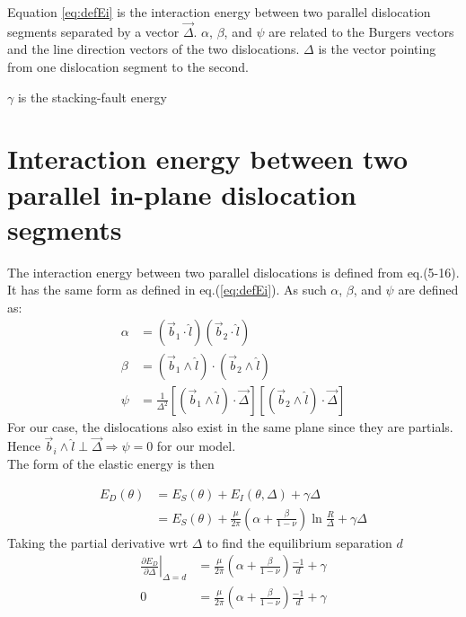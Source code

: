 \documentclass[10pt,a4paper,final]{article}
\begin{document}
Equation \ref{eq:defEi} is the interaction energy between two parallel dislocation segments separated by a vector $\vec{\Delta}$. $\alpha$, $\beta$, and $\psi$ are related to the Burgers vectors and the line direction vectors of the two dislocations. $\Delta$ is the vector pointing from one dislocation segment to the second.

$\gamma$ is the stacking-fault energy

\section{Interaction energy between two parallel in-plane dislocation segments}
The interaction energy between two parallel dislocations is defined from eq.(5-16)\cite{hirth1982theory}. It has the same form as defined in eq.(\ref{eq:defEi}). As such $\alpha$, $\beta$, and $\psi$ are defined as:
\begin{subequations}
\begin{align}
\alpha &= \left(\vec{b}_1 \cdot \hat{l}\right)\left(\vec{b}_2 \cdot \hat{l}\right) \\
\beta &= \left(\vec{b}_1 \wedge \hat{l}\right) \cdot \left(\vec{b}_2 \wedge \hat{l}\right) \\
\psi &= \frac{1}{\Delta^2}\left[\left(\vec{b}_1 \wedge \hat{l}\right) \cdot \vec{\Delta}\right]
\left[\left(\vec{b}_2 \wedge \hat{l}\right) \cdot \vec{\Delta}\right]
\end{align}
\label{eq:alphabeta}
\end{subequations}
For our case, the dislocations also exist in the same plane since they are partials. Hence $\vec{b}_i \wedge \hat{l} \perp \vec{\Delta} \Rightarrow \psi = 0$ for our model. \\ 

The form of the elastic energy is then

\begin{subequations}
\begin{align*}
E_D(\theta) &= E_S(\theta) + E_I(\theta,\Delta) + \gamma\Delta \\
 &= E_S(\theta) + \frac{\mu}{2\pi}\left(\alpha+\frac{\beta}{1-\nu}\right)\ln\frac{R}{\Delta} + \gamma\Delta
\end{align*}
\end{subequations}
Taking the partial derivative wrt $\Delta$ to find the equilibrium separation $d$
\begin{subequations}
\begin{align*}
\left.\frac{\partial E_D}{\partial\Delta}\right|_{\Delta=d} &= \frac{\mu}{2\pi}\left(\alpha+\frac{\beta}{1-\nu}\right)\frac{-1}{d} + \gamma \\
0 &= \frac{\mu}{2\pi}\left(\alpha+\frac{\beta}{1-\nu}\right)\frac{-1}{d} + \gamma \\
\end{align*}
\end{subequations} 
\end{document}
